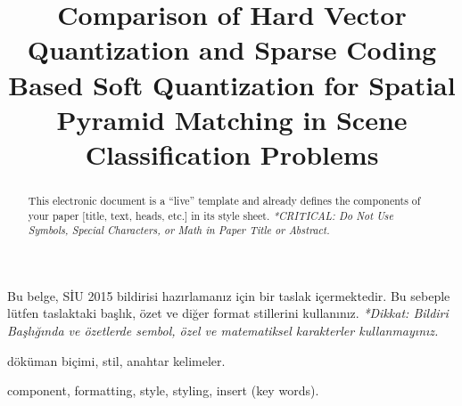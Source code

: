 \documentclass[conference]{IEEEtran}
\begin{document}

%
\title{Comparison of Hard Vector Quantization and Sparse Coding Based Soft
Quantization for Spatial Pyramid Matching in Scene Classification Problems}

\author{
\and
{}
}


%




\maketitle

\begin{ozet}
Bu belge, SİU 2015 bildirisi hazırlamanız için bir taslak içermektedir. Bu sebeple lütfen taslaktaki başlık, özet ve diğer format stillerini kullanınız.  \textit{*Dikkat:  Bildiri Başlığında ve özetlerde sembol, özel ve matematiksel karakterler kullanmayınız.}
\end{ozet}
\begin{IEEEanahtar}
döküman biçimi, stil, anahtar kelimeler.
\end{IEEEanahtar}

\begin{abstract}
This electronic document is a “live” template and already defines the components of your paper [title, text, heads, etc.] in its style sheet.  \textit{*CRITICAL:  Do Not Use Symbols, Special Characters, or Math in Paper Title or Abstract.}
\end{abstract}
\begin{IEEEkeywords}
component, formatting, style, styling, insert (key words).
\end{IEEEkeywords}
\end{document}
